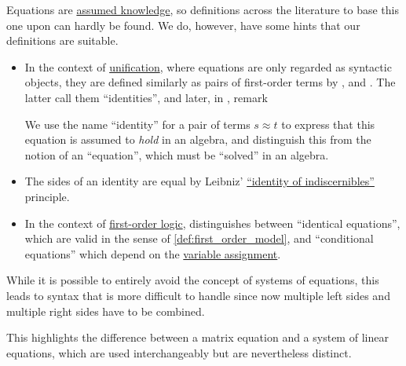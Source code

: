 \begin{comments}
  \item Equations are \hyperref[con:assumed_knowledge]{assumed knowledge}, so definitions across the literature to base this one upon can hardly be found. We do, however, have some hints that our definitions are suitable.

  \begin{itemize}
    \item In the context of \hyperref[con:unification]{unification}, where equations are only regarded as syntactic objects, they are defined similarly as pairs of first-order terms by ,  and . The latter call them \enquote{identities}, and later, in , remark
    \begin{displayquote}
      We use the name \enquote{identity} for a pair of terms \( s \approx t \) to express that this equation is assumed to \textit{hold} in an algebra, and distinguish this from the notion of an \enquote{equation}, which must be \enquote{solved} in an algebra.
    \end{displayquote}

    \item The sides of an identity are equal by Leibniz' \hyperref[rem:identity_of_indiscernibles]{\enquote{identity of indiscernibles}} principle.

    \item In the context of \hyperref[def:nth_order_logic]{first-order logic},  distinguishes between \enquote{identical equations}, which are valid in the sense of \cref{def:first_order_model}, and \enquote{conditional equations} which depend on the \hyperref[def:first_order_valuation/variable_assignment]{variable assignment}.
  \end{itemize}

  \item While it is possible to entirely avoid the concept of systems of equations, this leads to syntax that is more difficult to handle since now multiple left sides and multiple right sides have to be combined.

  This highlights the difference between a matrix equation and a system of linear equations, which are used interchangeably but are nevertheless distinct.
\end{comments}

